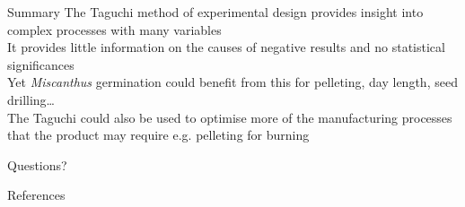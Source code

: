 \documentclass[10pt]{beamer}
\newcommand{\themename}{\textbf{\textsc{metropolis}}\xspace}
\begin{document}
\begin{frame}{Summary}
The Taguchi method of experimental design provides insight into complex processes with many variables \\ \vspace{5mm}
It provides little information on the causes of negative results and no statistical significances \\ \vspace{5mm}
Yet \textit{Miscanthus} germination could benefit from this for pelleting, day length, seed drilling\dots \\ \vspace{2mm}
The Taguchi could also be used to optimise more of the manufacturing processes that the product may require e.g. pelleting for burning
\end{frame}


{
\begin{frame}[standout]
  Questions?
\end{frame}
}

\appendix




\begin{frame}[allowframebreaks]{References}

  
  

\end{frame}
\end{document}
